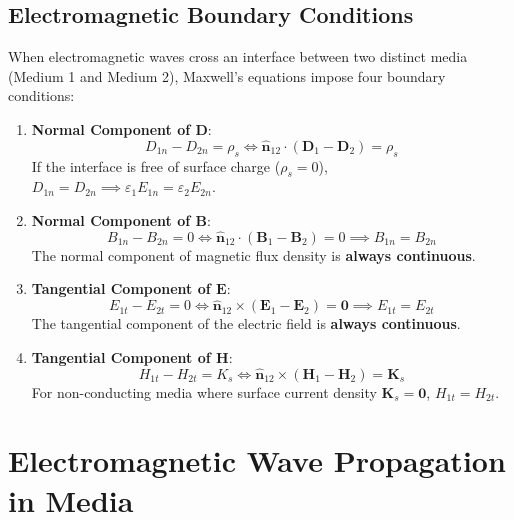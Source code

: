 \subsection{Electromagnetic Boundary Conditions}
When electromagnetic waves cross an interface between two distinct media (Medium 1 and Medium 2), Maxwell's equations impose four boundary conditions:
\begin{enumerate}
    \item \textbf{Normal Component of \texorpdfstring{$\mathbf{D}$}{D}}:
    \begin{equation}
        D_{1n} - D_{2n} = \rho_s \iff \hat{\mathbf{n}}_{12} \cdot (\mathbf{D}_1 - \mathbf{D}_2) = \rho_s
    \end{equation}
    If the interface is free of surface charge ($\rho_s = 0$), $D_{1n} = D_{2n} \implies \varepsilon_1 E_{1n} = \varepsilon_2 E_{2n}$.
    \item \textbf{Normal Component of \texorpdfstring{$\mathbf{B}$}{B}}:
    \begin{equation}
        B_{1n} - B_{2n} = 0 \iff \hat{\mathbf{n}}_{12} \cdot (\mathbf{B}_1 - \mathbf{B}_2) = 0 \implies B_{1n} = B_{2n}
    \end{equation}
    The normal component of magnetic flux density is \textbf{always continuous}.
    \item \textbf{Tangential Component of \texorpdfstring{$\mathbf{E}$}{E}}:
    \begin{equation}
        E_{1t} - E_{2t} = 0 \iff \hat{\mathbf{n}}_{12} \times (\mathbf{E}_1 - \mathbf{E}_2) = \mathbf{0} \implies E_{1t} = E_{2t}
    \end{equation}
    The tangential component of the electric field is \textbf{always continuous}.
    \item \textbf{Tangential Component of \texorpdfstring{$\mathbf{H}$}{H}}:
    \begin{equation}
        H_{1t} - H_{2t} = K_s \iff \hat{\mathbf{n}}_{12} \times (\mathbf{H}_1 - \mathbf{H}_2) = \mathbf{K}_s
    \end{equation}
    For non-conducting media where surface current density $\mathbf{K}_s = \mathbf{0}$, $H_{1t} = H_{2t}$.
\end{enumerate}

\section{Electromagnetic Wave Propagation in Media}

